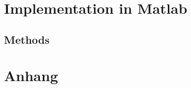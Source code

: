 \documentclass[headsepline,footsepline,footinclude=false,oneside,fontsize=11pt,paper=a4,listof=totoc,bibliography=totoc]{scrbook} %
\begin{document}
\chapter{Implementation in Matlab}
\section{Methods}

\chapter{Anhang}

\printbibliography{}
\end{document}
